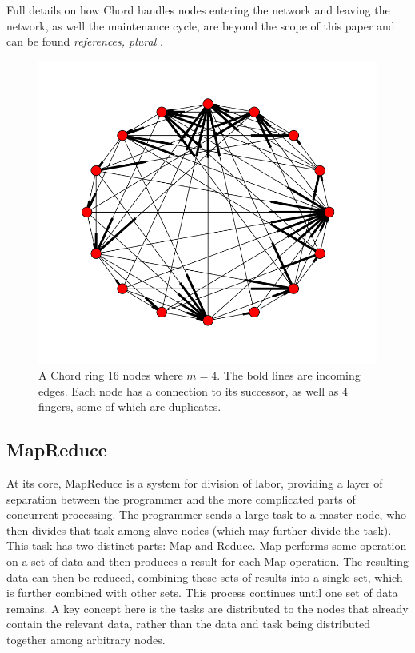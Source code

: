 \documentclass[10pt, conference, compsocconf]{IEEEtran}
\begin{document}
Full details on how Chord handles nodes entering the network and leaving the network, as well the maintenance cycle, are beyond the scope of this paper and can be found \textit{references, plural} \cite{Chord}.

\begin{figure}
    \includegraphics[width=\linewidth]{chordreal}
    \caption{A Chord ring 16 nodes where $m=4$.  The bold lines are incoming edges.  Each node has a connection to its successor, as well as 4 fingers, some of which are duplicates.}
    \label{chordreal}
\end{figure}


\subsection{MapReduce}
At its core, MapReduce \cite{mapreduce} is a system for division of labor, providing a layer of separation between the programmer and the more complicated parts of concurrent processing.  The programmer sends a large task to a master node, who then divides that task among slave nodes (which may further divide the task).  This task has two distinct parts: Map and Reduce.  Map performs some operation on a set of data and then produces a result for each Map operation.  The resulting data can then be reduced, combining these sets of results into a single set, which is further combined with other sets.  This process continues until one set of data remains.  A key concept here is the tasks are distributed to the nodes that already contain the relevant data, rather than the data and task being distributed together among arbitrary nodes.
\end{document}
